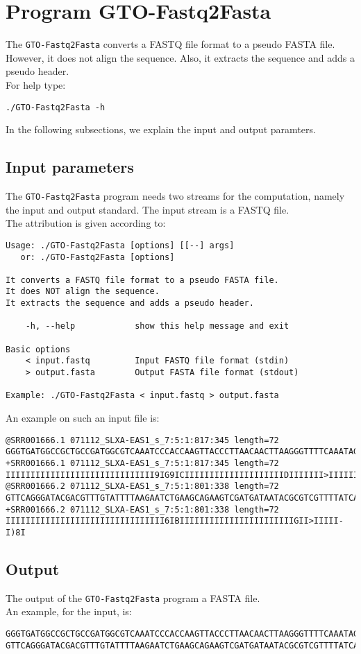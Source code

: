 \section{Program GTO-Fastq2Fasta}
The \texttt{GTO-Fastq2Fasta} converts a FASTQ file format to a pseudo FASTA file. However, it does not align the sequence. Also, it extracts the sequence and adds a pseudo header.\\
For help type:
\begin{lstlisting}
./GTO-Fastq2Fasta -h
\end{lstlisting}
In the following subsections, we explain the input and output paramters.

\subsection*{Input parameters}

The \texttt{GTO-Fastq2Fasta} program needs two streams for the computation,
namely the input and output standard. The input stream is a FASTQ file.\\
The attribution is given according to:
\begin{lstlisting}
Usage: ./GTO-Fastq2Fasta [options] [[--] args]
   or: ./GTO-Fastq2Fasta [options]

It converts a FASTQ file format to a pseudo FASTA file.
It does NOT align the sequence.
It extracts the sequence and adds a pseudo header.

    -h, --help            show this help message and exit

Basic options
    < input.fastq         Input FASTQ file format (stdin)
    > output.fasta        Output FASTA file format (stdout)

Example: ./GTO-Fastq2Fasta < input.fastq > output.fasta
\end{lstlisting}
An example on such an input file is:
\begin{lstlisting}
@SRR001666.1 071112_SLXA-EAS1_s_7:5:1:817:345 length=72
GGGTGATGGCCGCTGCCGATGGCGTCAAATCCCACCAAGTTACCCTTAACAACTTAAGGGTTTTCAAATAGA
+SRR001666.1 071112_SLXA-EAS1_s_7:5:1:817:345 length=72
IIIIIIIIIIIIIIIIIIIIIIIIIIIIII9IG9ICIIIIIIIIIIIIIIIIIIIIDIIIIIII>IIIIII/
@SRR001666.2 071112_SLXA-EAS1_s_7:5:1:801:338 length=72
GTTCAGGGATACGACGTTTGTATTTTAAGAATCTGAAGCAGAAGTCGATGATAATACGCGTCGTTTTATCAT
+SRR001666.2 071112_SLXA-EAS1_s_7:5:1:801:338 length=72
IIIIIIIIIIIIIIIIIIIIIIIIIIIIIIII6IBIIIIIIIIIIIIIIIIIIIIIIIGII>IIIII-I)8I
\end{lstlisting}

\subsection*{Output}
The output of the \texttt{GTO-Fastq2Fasta} program a FASTA file.\\
An example, for the input, is:
\begin{lstlisting}
GGGTGATGGCCGCTGCCGATGGCGTCAAATCCCACCAAGTTACCCTTAACAACTTAAGGGTTTTCAAATAGA
GTTCAGGGATACGACGTTTGTATTTTAAGAATCTGAAGCAGAAGTCGATGATAATACGCGTCGTTTTATCAT
\end{lstlisting}
